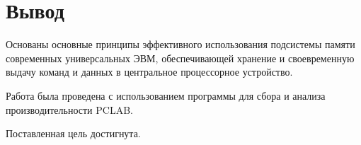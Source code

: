 \chapter*{Вывод}

Основаны основные принципы эффективного использования подсистемы памяти современных универсальных ЭВМ,
обеспечивающей хранение и своевременную выдачу команд и данных в центральное процессорное устройство. 

Работа была проведена с использованием программы для сбора и анализа производительности PCLAB.

Поставленная цель достигнута.